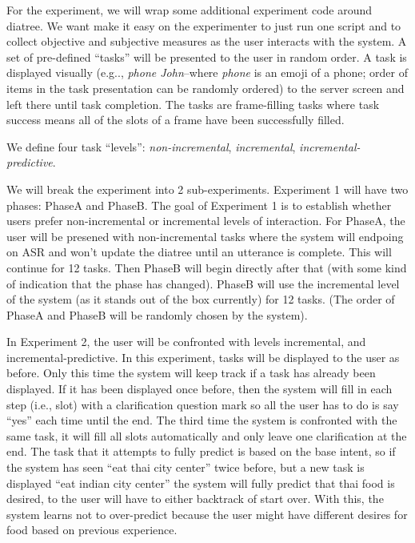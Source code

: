 \documentclass[a4paper,10pt]{article}
\begin{document}
For the experiment, we will wrap some additional experiment code around diatree. We want make it easy on the experimenter to just run one script and to collect objective and subjective measures as the user interacts with the system. A set of pre-defined ``tasks'' will be presented to the user in random order. A task is displayed visually (e.g.., \emph{phone John}--where \emph{phone} is an emoji of a phone; order of items in the task presentation can be randomly ordered) to the server screen and left there until task completion. The tasks are frame-filling tasks where task success means all of the slots of a frame have been successfully filled. 

We define four task ``levels'': \emph{non-incremental}, \emph{incremental}, \emph{incremental-predictive}.

We will break the experiment into 2 sub-experiments. Experiment 1 will have two phases: PhaseA and PhaseB. The goal of Experiment 1 is to establish whether users prefer non-incremental or incremental levels of interaction. For PhaseA, the user will be presened with non-incremental tasks where the system will endpoing on ASR and won't update the diatree until an utterance is complete. This will continue for 12 tasks. Then PhaseB will begin directly after that (with some kind of indication that the phase has changed). PhaseB will use the incremental level of the system (as it stands out of the box currently) for 12 tasks. (The order of PhaseA and PhaseB will be randomly chosen by the system). 

In Experiment 2, the user will be confronted with levels incremental, and incremental-predictive. In this experiment, tasks will be displayed to the user as before. Only this time the system will keep track if a task has already been displayed. If it has been displayed once before, then the system will fill in each step (i.e., slot) with a clarification question mark so all the user has to do is say ``yes'' each time until the end. The third time the system is confronted with the same task, it will fill all slots automatically and only leave one clarification at the end. The task that it attempts to fully predict is based on the base intent, so if the system has seen ``eat thai city center'' twice before, but a new task is displayed ``eat indian city center'' the system will fully predict that thai food is desired, to the user will have to either backtrack of start over. With this, the system learns not to over-predict because the user might have different desires for food based on previous experience. 
\end{document}

